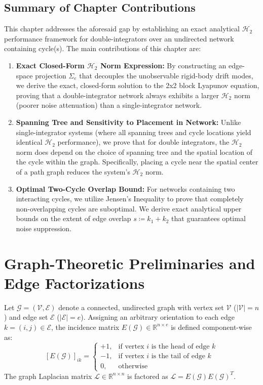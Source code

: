 \subsection*{Summary of Chapter Contributions}
This chapter addresses the aforesaid gap by establishing an exact analytical $\mathcal{H}_2$ performance framework for double-integrators over an undirected network containing cycle(s). The main contributions of this chapter are:
\begin{enumerate}
    \item \textbf{Exact Closed-Form $\mathcal{H}_2$ Norm Expression:} By constructing an edge-space projection $\Sigma_e$ that decouples the unobservable rigid-body drift modes, we derive the exact, closed-form solution to the 2x2 block Lyapunov equation, proving that a double-integrator network always exhibits a larger $\mathcal{H}_2$ norm (poorer noise attenuation) than a single-integrator network.
    \item \textbf{Spanning Tree and Sensitivity to Placement in Network:} Unlike single-integrator systems (where all spanning trees and cycle locations yield identical $\mathcal{H}_2$ performance), we prove that for double integrators, the $\mathcal{H}_2$ norm does depend on the choice of spanning tree and the spatial location of the cycle within the graph. Specifically, placing a cycle near the spatial center of a path graph reduces the system's $\mathcal{H}_2$ norm.
    \item \textbf{Optimal Two-Cycle Overlap Bound:} For networks containing two interacting cycles, we utilize Jensen's Inequality to prove that completely non-overlapping cycles are suboptimal. We derive exact analytical upper bounds on the extent of edge overlap $s \coloneqq  k_1 + k_2$ that guarantees optimal noise suppression.
\end{enumerate}
\section{Graph-Theoretic Preliminaries and Edge Factorizations}\label{sec:ch4_preliminaries}
Let $\mathcal{G} = (\mathcal{V}, \mathcal{E})$ denote a connected, undirected graph with vertex set $\mathcal{V}$ ($|\mathcal{V}| = n$) and edge set $\mathcal{E}$ ($|\mathcal{E}| = e$). Assigning an arbitrary orientation to each edge $k = (i,j) \in \mathcal{E}$, the incidence matrix $E(\mathcal{G}) \in \mathbb{R}^{n \times e}$ is defined component-wise as:
\begin{equation}\label{eq:ch_RA_incidence_def}
	[E(\mathcal{G})]_{ik} = \begin{cases}
		+1, & \text{if vertex } i \text{ is the head of edge } k \\
		-1, & \text{if vertex } i \text{ is the tail of edge } k \\
		0, & \text{otherwise}
	\end{cases}
\end{equation}
The graph Laplacian matrix $\mathcal{L} \in \mathbb{R}^{n \times n}$ is factored as $\mathcal{L} = E(\mathcal{G}) E(\mathcal{G})^T$. 


